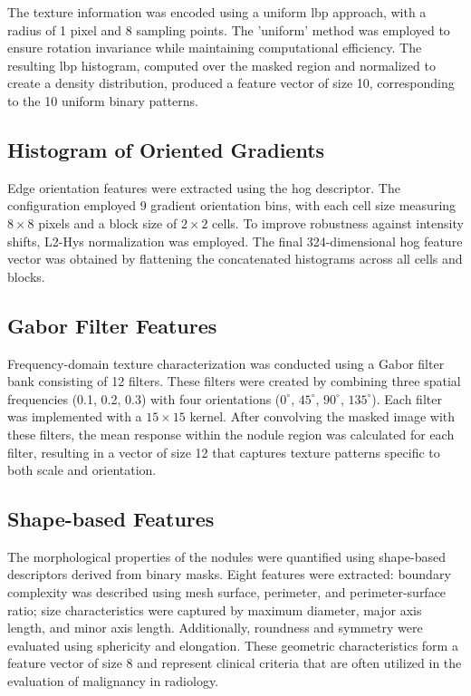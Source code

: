 The texture information was encoded using a uniform \ac{lbp} approach, with a radius of 1 pixel and 8 sampling points. The 'uniform' method was employed to ensure rotation invariance while maintaining computational efficiency. The resulting \ac{lbp} histogram, computed over the masked region and normalized to create a density distribution, produced a feature vector of size 10, corresponding to the 10 uniform binary patterns.

\subsection*{Histogram of Oriented Gradients}

Edge orientation features were extracted using the \ac{hog} descriptor. The configuration employed 9 gradient orientation bins, with each cell size measuring $8 \times 8$ pixels and a block size of $2 \times 2$ cells. To improve robustness against intensity shifts, L2-Hys normalization was employed. The final 324-dimensional \ac{hog} feature vector was obtained by flattening the concatenated histograms across all cells and blocks.

\subsection*{Gabor Filter Features}

Frequency-domain texture characterization was conducted using a Gabor filter bank consisting of 12 filters.
These filters were created by combining three spatial frequencies (0.1, 0.2, 0.3) with four orientations ($0^\circ$, $45^\circ$, $90^\circ$, $135^\circ$). Each filter was implemented with a $15 \times 15$ kernel. After convolving the masked image with these filters, the mean response within the nodule region was calculated for each filter, resulting in a vector of size 12 that captures texture patterns specific to both scale and orientation.

\subsection*{Shape-based Features}

The morphological properties of the nodules were quantified using shape-based descriptors derived from binary masks. Eight features were extracted: boundary complexity was described using mesh surface, perimeter, and perimeter-surface ratio; size characteristics were captured by maximum diameter, major axis length, and minor axis length. Additionally, roundness and symmetry were evaluated using sphericity and elongation. These geometric characteristics form a feature vector of size 8 and represent clinical criteria that are often utilized in the evaluation of malignancy in radiology.

